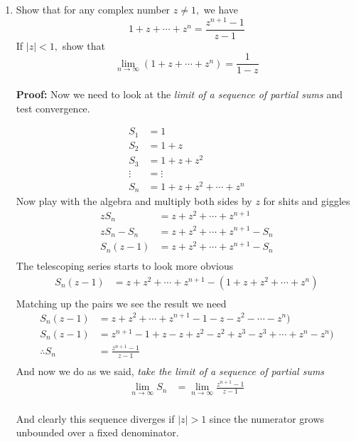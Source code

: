 \begin{enumerate}
	\item Show that for any complex number $z \neq 1,$ we have
	\[ 1 + z + \cdots + z^n = \frac{z^{n + 1} - 1}{z - 1}\]
	If $|z| < 1,$ show that
	\[ \lim_{n \to \infty} (1 + z + \cdots + z^n ) = \frac{1}{1 - z} \] \\
		
	\textbf{Proof:}
	Now we need to look at the \textit{limit of a sequence of partial sums} and test convergence.

	\begin{align*}
		S_1 &= 1 \\
		S_2 &= 1 + z \\
		S_3 &= 1 + z + z^2 \\
		\vdots &= \vdots \\
		S_n &= 1 + z + z^2 + \cdots + z^n
	\end{align*}
	Now play with the algebra and multiply both sides by $z$ for shits and giggles
	\begin{align*}
		zS_n &= z + z^2 + \cdots + z^{n +1} \\
		zS_n - S_n &= z + z^2 + \cdots + z^{n +1} - S_n \\
		S_n(z - 1) &= z + z^2 + \cdots + z^{n +1} - S_n \\
	\end{align*}
	The telescoping series starts to look more obvious
	\begin{align*}
		S_n(z - 1) &= z + z^2 + \cdots + z^{n +1} - (1 + z + z^2 + \cdots + z^n) \\
	\end{align*}
	Matching up the pairs we see the result we need
	\begin{align*}
		S_n(z - 1) &= z + z^2 + \cdots + z^{n +1} - 1 - z - z^2 - \cdots - z^n) \\
		S_n(z - 1) &= z^{n +1} - 1 + z - z + z^2 - z^2 + z^3 - z^3 + \cdots + z^n - z^n) \\
		\therefore S_n &= \frac{z^{n +1} - 1}{z - 1} \\
	\end{align*}
	And now we do as we said, \textit{take the limit of a sequence of partial sums}
	\begin{align*}
		\lim_{n \to \infty} S_n &= \lim_{n \to \infty} \frac{z^{n +1} - 1}{z - 1} \\
	\end{align*}

	And clearly this sequence diverges if $|z| > 1$ since the numerator grows unbounded over a fixed denominator.


\end{enumerate}
